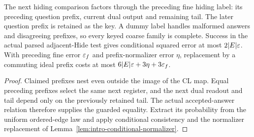\begin{lemma}
\label{lem:intro-guarded-hiding-maps}
\leanok
The next hiding comparison factors through the preceding fine hiding label:
its preceding question prefix, current dual output and remaining tail.
The later question prefix is retained as the key. A dummy label handles
malformed answers and disagreeing prefixes, so every keyed coarse family
is complete. Success in the actual parsed adjacent-Hide test gives conditional
squared error at most $2|E|\varepsilon$. With preceding fine error $\varepsilon_f$ and
prefix-normalizer error $\eta$, replacement by a commuting ideal prefix
costs at most $6|E|\varepsilon+3\eta+3\varepsilon_f$.
\end{lemma}
\begin{proof}
\leanok
Claimed prefixes nest even outside the image of the CL map. Equal preceding
prefixes select the same next register, and the next dual readout and tail
depend only on the previously retained tail. The actual accepted-answer
relation therefore supplies the guarded equality. Extract its probability
from the uniform ordered-edge law and apply conditional consistency and
the normalizer replacement of Lemma~\ref{lem:intro-conditional-normalizer}.
\end{proof}

